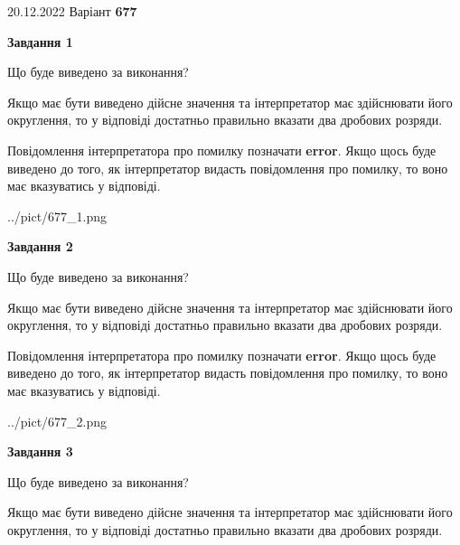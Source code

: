 \documentclass[12pt, ukrainian]{article}
\begin{document}
{20.12.2022 Варіант \No \textbf { 677 }\par}
{
\begin {Large}

{\begin {center}\textbf{Завдання 1}\end {center}}\par
Що буде виведено за виконання? \par

Якщо має бути виведено дійсне значення та інтерпретатор має здійснювати його округлення, 
то у відповіді достатньо правильно вказати два дробових розряди.

Повідомлення інтерпретатора про помилку позначати \textbf{error}.
Якщо щось буде виведено до того, як інтерпретатор видасть повідомлення про помилку, 
то воно має вказуватись у відповіді. \par

\begin{center}
	{../pict/677_1.png}
\end{center}
\newpage

{\begin {center}\textbf{Завдання 2}\end {center}}\par
Що буде виведено за виконання? \par

Якщо має бути виведено дійсне значення та інтерпретатор має здійснювати його округлення, 
то у відповіді достатньо правильно вказати два дробових розряди.

Повідомлення інтерпретатора про помилку позначати \textbf{error}.
Якщо щось буде виведено до того, як інтерпретатор видасть повідомлення про помилку, 
то воно має вказуватись у відповіді. \par

\begin{center}
	{../pict/677_2.png}
\end{center}
\newpage

{\begin {center}\textbf{Завдання 3}\end {center}}\par
Що буде виведено за виконання? \par

Якщо має бути виведено дійсне значення та інтерпретатор має здійснювати його округлення, 
то у відповіді достатньо правильно вказати два дробових розряди.


\end{Large}}
\end{document}
